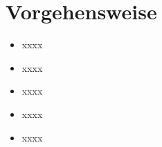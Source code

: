 \section{Vorgehensweise }

\begin{itemize}

   \item xxxx
   \item xxxx
   \item xxxx
   \item xxxx
   \item xxxx
\end{itemize}








